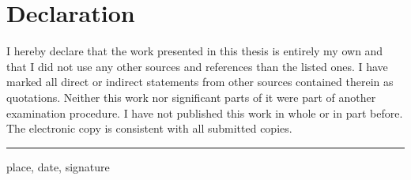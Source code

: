 \chapter*{Declaration}
I hereby declare that the work presented in this thesis is entirely
my own and that I did not use any other sources and references
than the listed ones. I have marked all direct or indirect statements
from other sources contained therein as quotations. Neither this
work nor significant parts of it were part of another examination
procedure. I have not published this work in whole or in part
before. The electronic copy is consistent with all submitted copies.

\vspace*{2cm}
\parindent0pt
\rule{\linewidth}{0.1mm}
place, date, signature
